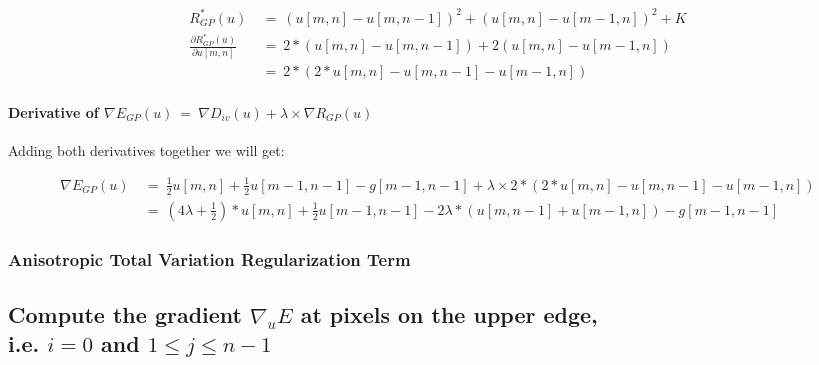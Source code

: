 \documentclass{report}
\begin{document}
\begin{enumerate}[(i)]
\begin{adjustwidth}{-8em}{}
							\vspace{-0.5cm}
							\begin{align*}
								R_{GP}^*(u) \ & = \ (u[m,n] - u[m,n-1])^2 + (u[m,n] - u[m-1,n])^2 + K \\
								\frac{\partial R_{GP}^*(u)}{\partial u[m,n]} \ & = \ 2 * (u[m,n] - u[m,n-1]) + 2 (u[m,n] - u[m-1,n]) \\
								& = \ 2 * (2 * u[m,n] - u[m,n-1] - u[m-1,n])
							\end{align*}
						\end{adjustwidth}
						\vspace{-0.6cm} \paragraph{Derivative of $\nabla E_{GP}(u) \ = \ \nabla D_{iv}(u) + \lambda \times \nabla R_{GP}(u)$}
						\startsubsection
							Adding both derivatives together we will get:
						\closesection
						\begin{adjustwidth}{-9em}{}
							\vspace{-0.6cm}
							\begin{align*}
								\nabla E_{GP}(u) \ & = \ \frac{1}{2} u[m,n]  + \frac{1}{2} u[m-1,n-1] - g[m-1,n-1] + \lambda \times 2 * (2 * u[m,n] - u[m,n-1] - u[m-1,n]) \\
								& = \ (4\lambda + \frac{1}{2}) * u[m,n] + \frac{1}{2} u[m-1,n-1] - 2\lambda*(u[m,n-1] + u[m-1,n]) - g[m-1,n-1]
							\end{align*}
						\end{adjustwidth}
					\end{enumerate}
				\closesection
			\closesection
			\subsubsection{Anisotropic Total Variation Regularization Term}
			\startsubsection
			\closesection
		\closesection
		
		\subsection{Compute the gradient $\nabla_u E$ at pixels on the upper edge, \\ i.e. $i = 0$ and $1 \leq j \leq n-1$}
		\startsubsection
\end{document}
